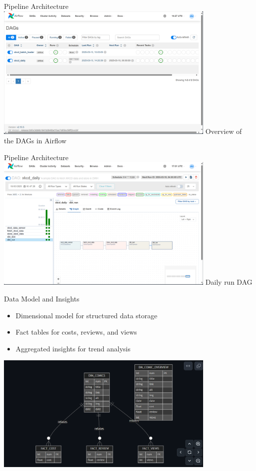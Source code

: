 \documentclass{beamer}
\begin{document}
\begin{frame}{Pipeline Architecture}
    \centering
    \includegraphics[width=0.8\textwidth]{../screenshots/airflow.png}
    \newline
    Overview of the DAGs in Airflow
\end{frame}

\begin{frame}{Pipeline Architecture}
    \centering
    \includegraphics[width=0.8\textwidth]{../screenshots/airflow-dag.png}
    \newline
    Daily run DAG
\end{frame}

\begin{frame}{Data Model and Insights}
    \begin{itemize}
        \item Dimensional model for structured data storage
        \item Fact tables for costs, reviews, and views
        \item Aggregated insights for trend analysis
    \end{itemize}
    \centering
    \vspace{5em}
    \includegraphics[width=0.8\textwidth]{../screenshots/er-diagram.png}
\end{frame}
\end{document}
